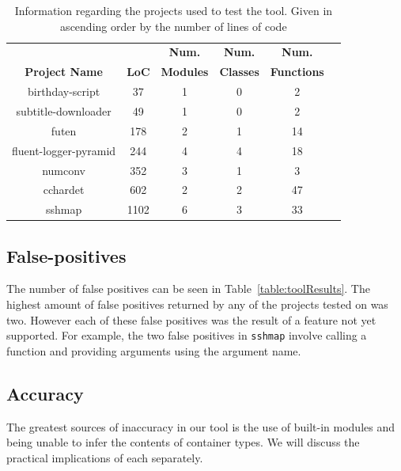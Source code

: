 \documentclass[12pt, titlepage]{article}
\begin{document}
	\begin{table}[bp]
	\centering
    \begin{tabular}{ | c | c | c | c | c | c |}
    \hline
     &  & \textbf{Num.} & \textbf{Num.}  & \textbf{Num.}  \\
    \textbf{Project Name} & \textbf{LoC} & \textbf{Modules} & \textbf{Classes} & \textbf{Functions} \\ \hline
    birthday-script & 37 & 1 & 0 & 2 \\ \hline
    subtitle-downloader & 49 & 1 & 0 & 2 \\ \hline
    futen & 178 & 2 & 1 & 14 \\ \hline
    fluent-logger-pyramid & 244 & 4 & 4 & 18 \\ \hline
    numconv & 352 & 3 & 1 & 3 \\ \hline
    cchardet & 602 & 2 & 2 & 47  \\ \hline
    sshmap & 1102 & 6 & 3 & 33 \\ \hline
    \end{tabular}
    \caption{Information regarding the projects used to test the tool. Given in ascending order by the number of lines of code}
	\label{table:toolTests}
    \end{table}
    


\subsection{False-positives}
The number of false positives can be seen in Table~\ref{table:toolResults}. The highest amount of false positives returned by any of the projects tested on was two. However each of these false positives was the result of a feature not yet supported. For example, the two false positives in \texttt{sshmap} involve calling a function and providing arguments using the argument name.

\subsection{Accuracy}
The greatest sources of inaccuracy in our tool is the use of built-in modules and being unable to infer the contents of container types. We will discuss the practical implications of each separately.
\end{document}
